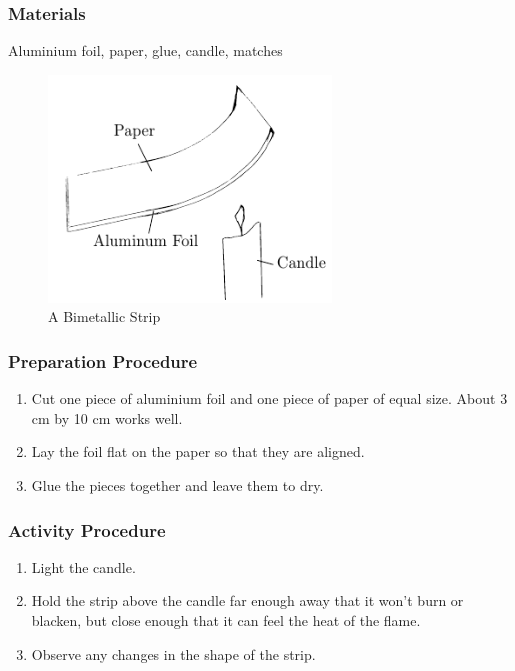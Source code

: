 \subsubsection*{Materials}
Aluminium foil, paper, glue, candle, matches

\begin{figure}
\begin{center}
\includegraphics{./img/bimetallic-strip.png}
\caption{A Bimetallic Strip}
\label{fig:bimetallic-strip}
\end{center}
\end{figure}

\subsubsection*{Preparation Procedure}
\begin{enumerate}
\item{Cut one piece of aluminium foil and one piece of paper of equal size. About 3 cm by 10 cm works well.} 
\item{Lay the foil flat on the paper so that they are aligned.} 
\item{Glue the pieces together and leave them to dry.} 
\end{enumerate}

\subsubsection*{Activity Procedure}
\begin{enumerate}
\item{Light the candle.} 
\item{Hold the strip above the candle far enough away that it won't burn or blacken, but close enough that it can feel the heat of the flame.} 
\item{Observe any changes in the shape of the strip.} 
\end{enumerate}

